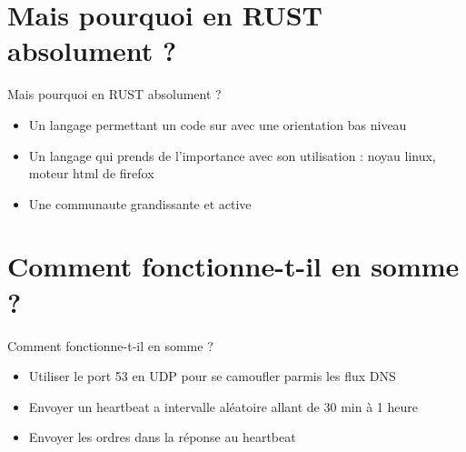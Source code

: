\documentclass{beamer}
\begin{document}
\section{Mais pourquoi en RUST absolument ?}
  \begin{frame}{Mais pourquoi en RUST absolument ?}
  \begin{itemize}
	\item Un langage permettant un code sur avec une orientation bas niveau
	\item Un langage qui prends de l'importance avec son utilisation : noyau linux, moteur html de firefox
	\item Une communaute grandissante et active
  \end{itemize}
  \end{frame}

\section{Comment fonctionne-t-il en somme ?}
  \begin{frame}{Comment fonctionne-t-il en somme ?}
  \begin{itemize}
	\item Utiliser le port 53 en UDP pour se camoufler parmis les flux DNS
	\item Envoyer un heartbeat a intervalle aléatoire allant de 30 min à 1 heure
	\item Envoyer les ordres dans la réponse au heartbeat
  \end{itemize}
  \end{frame}
\end{document}
